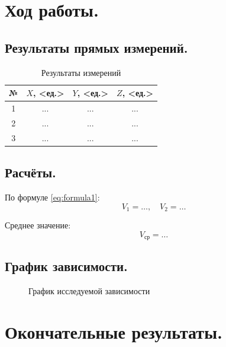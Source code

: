 \documentclass[12pt, a4paper]{article}
\begin{document}
	\section{Ход работы.}
	
	\subsection{Результаты прямых измерений.}
	
	\begin{table}[H]
		\centering
		\begin{tabular}{|c|c|c|c|}
			\hline
			№ & \(X\), <ед.> & \(Y\), <ед.> & \(Z\), <ед.> \\
			\hline
			1 & ... & ... & ... \\
			2 & ... & ... & ... \\
			3 & ... & ... & ... \\
			\hline
		\end{tabular}
		\caption{Результаты измерений}
		\label{tab:results}
	\end{table}
	
	\subsection{Расчёты.}
	
	По формуле \eqref{eq:formula1}:
	\[
	V_1 = \dots, \quad V_2 = \dots
	\]
	
	Среднее значение:
	\[
	V_{\text{ср}} = \dots
	\]
	
	\subsection{График зависимости.}
	
	\begin{figure}[H]
		\centering
		\caption{График исследуемой зависимости}
		\label{fig:graph}
	\end{figure}
	
	\section{Окончательные результаты.}
	
\end{document}
